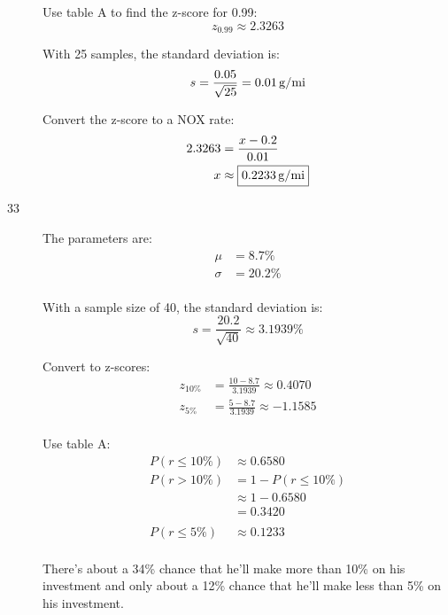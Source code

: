 \documentclass[letterpaper, landscape]{exam}
\begin{document}
\begin{description}
        Use table A to find the z-score for 0.99:
        \[
          z_{0.99} \approx 2.3263
        \]

        With 25 samples, the standard deviation is:
        \[
          s = \frac{0.05}{\sqrt{25}} = \unit[0.01]{g/mi}
        \]

        Convert the z-score to a NOX rate:
        \begin{align*}
          2.3263 & = \frac{x - 0.2}{0.01} \\
          x     & \approx \boxed{ \unit[0.2233]{g/mi} } \\
        \end{align*}

      \item[33]
        The parameters are:
        \begin{align*}
          \mu    & = 8.7\% \\
          \sigma & = 20.2\% \\
        \end{align*}

        With a sample size of 40, the standard deviation is:
        \[
          s = \frac{20.2}{\sqrt{40}} \approx 3.1939\%
        \]

        Convert to z-scores:
        \begin{align*}
          z_{10\%} & = \frac{10 - 8.7}{3.1939} \approx 0.4070 \\
          z_{5\%}  & = \frac{5 - 8.7}{3.1939} \approx -1.1585 \\
        \end{align*}

        Use table A:
        \begin{align*}
          P(r \leq 10\%) & \approx \boxed{ 0.6580 } \\
          P(r > 10\%)    & = 1 - P(r \leq 10\%) \\
                         & \approx 1 - 0.6580 \\
                         & = \boxed{ 0.3420 } \\
          \\
          P(r \leq 5\%)  & \approx \boxed{ 0.1233 } \\
        \end{align*}

        There's about a 34\% chance that he'll make more than 10\% on his
        investment and only about a 12\% chance that he'll make less than 5\% on
        his investment.


\end{description}
\end{document}

